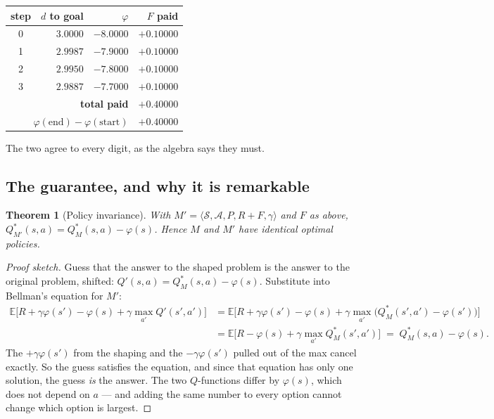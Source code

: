 \documentclass[11pt,a4paper]{article}
\newcommand{\E}{\mathbb{E}}
\newtheorem{theorem}{Theorem}
\begin{document}
\begin{center}
\small
\begin{tabular}{crrr}
\toprule
\textbf{step} & \textbf{$d$ to goal} & \textbf{$\varphi$} & \textbf{$F$ paid} \\
\midrule
0 & $3.0000$ & $-8.0000$ & $+0.10000$ \\
1 & $2.9987$ & $-7.9000$ & $+0.10000$ \\
2 & $2.9950$ & $-7.8000$ & $+0.10000$ \\
3 & $2.9887$ & $-7.7000$ & $+0.10000$ \\
\midrule
\multicolumn{3}{r}{\textbf{total paid}} & $\mathbf{+0.40000}$ \\
\multicolumn{3}{r}{$\varphi(\text{end}) - \varphi(\text{start})$} & $\mathbf{+0.40000}$ \\
\bottomrule
\end{tabular}
\end{center}

The two agree to every digit, as the algebra says they must.

\subsection{The guarantee, and why it is remarkable}

\begin{theorem}[Policy invariance]
With $M' = \langle \mathcal S,\mathcal A,P,R+F,\gamma\rangle$ and $F$ as above,
$Q^*_{M'}(s,a) = Q^*_M(s,a) - \varphi(s)$. Hence $M$ and $M'$ have identical optimal
policies.
\end{theorem}

\begin{proof}[Proof sketch]
Guess that the answer to the shaped problem is the answer to the original problem, shifted:
$Q'(s,a) = Q^*_M(s,a) - \varphi(s)$. Substitute into Bellman's equation for $M'$:
\begin{align*}
\E\big[R + \gamma\varphi(s') - \varphi(s) + \gamma\max_{a'} Q'(s',a')\big]
&= \E\big[R + \gamma\varphi(s') - \varphi(s) + \gamma\max_{a'}\big(Q^*_M(s',a') - \varphi(s')\big)\big]\\
&= \E\big[R - \varphi(s) + \gamma\max_{a'}Q^*_M(s',a')\big] \;=\; Q^*_M(s,a) - \varphi(s).
\end{align*}
The $+\gamma\varphi(s')$ from the shaping and the $-\gamma\varphi(s')$ pulled out of the max
cancel exactly. So the guess satisfies the equation, and since that equation has only one
solution, the guess \emph{is} the answer. The two $Q$-functions differ by $\varphi(s)$, which
does not depend on $a$ --- and adding the same number to every option cannot change which
option is largest.
\end{proof}
\end{document}
